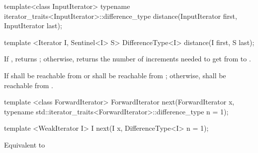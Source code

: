 %
\begin{removedblock}
\begin{itemdecl}
  template<class InputIterator>
      typename iterator_traits<InputIterator>::difference_type
         distance(InputIterator first, InputIterator last);
\end{itemdecl}
\end{removedblock}
\begin{addedblock}
\begin{itemdecl}
template <Iterator I, Sentinel<I> S>
  DifferenceType<I> distance(I first, S last);
\end{itemdecl}
\end{addedblock}

\begin{itemdescr}
\pnum
\effects

If 
, returns ; otherwise,
returns the number of increments needed to get from
to
.

\pnum
\requires
If 
  shall be reachable from
 or  shall be reachable from ; otherwise,
shall be reachable from
.
\end{itemdescr}

%
\begin{removedblock}
\begin{itemdecl}
template <class ForwardIterator>
  ForwardIterator next(ForwardIterator x,
    typename std::iterator_traits<ForwardIterator>::difference_type n = 1);
\end{itemdecl}
\end{removedblock}
\begin{addedblock}
\begin{itemdecl}
template <WeakIterator I>
  I next(I x, DifferenceType<I> n = 1);
\end{itemdecl}
\end{addedblock}

\begin{itemdescr}
\pnum
\effects Equivalent to 
\end{itemdescr}

